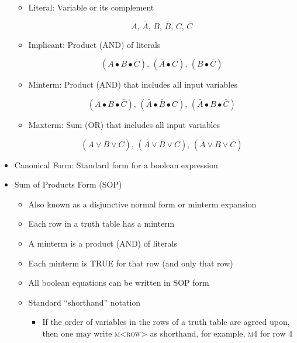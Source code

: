 \begin{itemize}
\begin{itemize}
      \item Literal: Variable or its complement

        $$A,\,\bar{A},\,B,\,\bar{B},\,C,\,\bar{C}$$

      \item Implicant: Product (AND) of literals

        $$(A\bullet B\bullet\bar{C}),\,(\bar{A}\bullet C),\,(B\bullet\bar{C})$$

      \item Minterm: Product (AND) that includes all input variables

        $$(A\bullet B\bullet \bar{C}),\,(\bar{A}\bullet\bar{B}\bullet C),\,(\bar{A}\bullet B\bullet\bar{C})$$

      \item Maxterm: Sum (OR) that includes all input variables

        $$(A\vee B\vee \bar{C}),\,(\bar{A}\vee\bar{B}\vee C),\,(\bar{A}\vee B\vee\bar{C})$$

    \end{itemize}

  \item Canonical Form: Standard form for a boolean expression

  \item Sum of Products Form (SOP)

    \begin{itemize}

      \item Also known as a disjunctive normal form or minterm expansion

      \item Each row in a truth table has a minterm

      \item A minterm is a product (AND) of literals

      \item Each minterm is TRUE for that row (and only that row)

      \item All boolean equations can be written in SOP form

      \item Standard ``shorthand'' notation

        \begin{itemize}

          \item If the order of variables in the rows of a truth table are agreed upon, then one may write \textsc{m<row>} as shorthand, for example, \textsc{m4} for row 4


\end{itemize}
\end{itemize}
\end{itemize}
